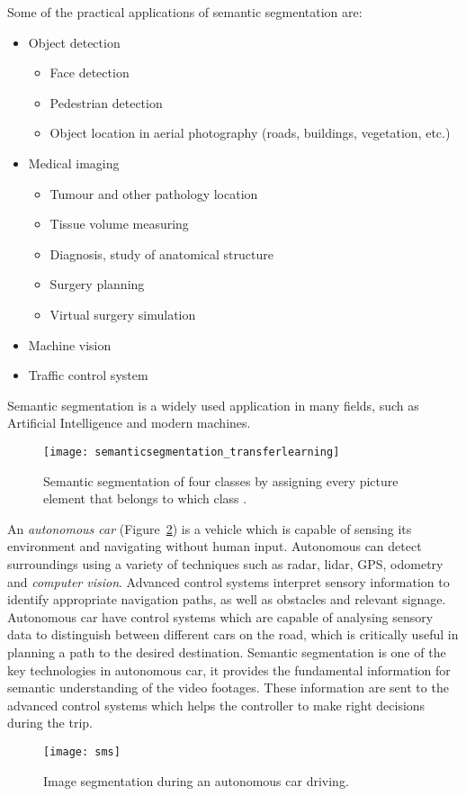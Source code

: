 Some of the practical applications of semantic segmentation are:
\begin{itemize}
    \item Object detection \cite{delmerico2011building}
    \begin{itemize}
    \item Face detection
    \item Pedestrian detection
    \item Object location in aerial photography (roads, buildings, vegetation,
    etc.)
    \end{itemize}
    \item Medical imaging \cite{pham2000current}
    \cite{forouzanfar2010parameter}
    \begin{itemize}
    \item Tumour and other pathology location \cite{wu2014brain}
    \cite{george2012mr}
    \item Tissue volume measuring
    \item Diagnosis, study of anatomical structure
        \cite{kamalakannan2010double}
    \item Surgery planning
    \item Virtual surgery simulation
    \end{itemize}
    \item Machine vision
    \item{Traffic control system}
\end{itemize}
Semantic segmentation is a widely used application in many fields, such as Artificial Intelligence and
modern machines.
\begin{figure}[h]
    \centering
    \texttt{[image: semanticsegmentation\_transferlearning]}
    \caption{
    Semantic segmentation of four classes by assigning every picture element
    that belongs to which class \cite{matlab_segmentation}.
    }
    \label{fig:four_class_segmentation}
\end{figure}


An \emph{autonomous car} (Figure~\ref{fig:autonomous_car}) is a vehicle which
is capable of sensing its environment and navigating without human input.
\cite{gehrig1999dead} Autonomous can detect surroundings using a variety of
techniques such as radar, lidar, GPS, odometry and \emph{computer vision}.
Advanced control systems interpret sensory information to identify appropriate
navigation paths, as well as obstacles and relevant signage. Autonomous car
have control systems which are capable of analysing sensory data to distinguish
between different cars on the road, which is critically useful in planning a
path to the desired destination. Semantic segmentation is one of the key
technologies in autonomous car, it provides the fundamental information for
semantic understanding of the video footages. These information are sent to the
advanced control systems which helps the controller to make right decisions
during the trip.
\begin{figure}[h]
    \centering
    \texttt{[image: sms]}
    \caption{Image segmentation during an autonomous car driving.}
    \label{fig:autonomous_car}
\end{figure}


